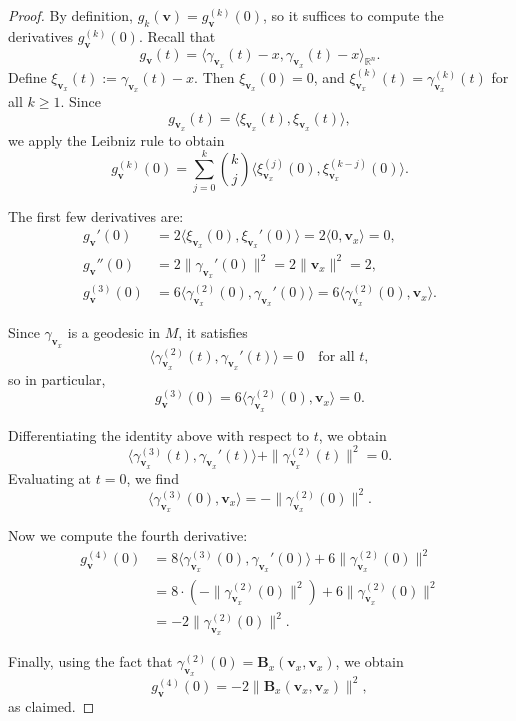 \documentclass{amsart}
\theoremstyle{Theorem}
\theoremstyle{remark}
\numberwithin{equation}{section} \numberwithin{figure}{section}
\newcommand{\mf}[1]{\mathbf{#1}}
\begin{document}
\begin{proof}
By definition, \( g_k(\mathbf{v}) = g_{\mathbf{v}}^{(k)}(0) \), so it suffices to compute the derivatives \( g_{\mathbf{v}}^{(k)}(0) \). Recall that
\[
g_{\mathbf{v}}(t) = \langle \gamma_{\mathbf{v}_{x}}(t) - x, \gamma_{\mathbf{v}_{x}}(t) - x \rangle_{\mathbb{R}^n}.
\]
Define \( \xi_{\mathbf{v}_{x}}(t) := \gamma_{\mathbf{v}_{x}}(t) - x \). Then \( \xi_{\mathbf{v}_{x}}(0) = 0 \), and \( \xi_{\mathbf{v}_{x}}^{(k)}(t) = \gamma_{\mathbf{v}_{x}}^{(k)}(t) \) for all \( k \geq 1 \). Since
\[
g_{\mathbf{v}_{x}}(t) = \langle \xi_{\mathbf{v}_{x}}(t), \xi_{\mathbf{v}_{x}}(t) \rangle,
\]
we apply the Leibniz rule to obtain
\[
g_{\mathbf{v}}^{(k)}(0) = \sum_{j=0}^{k} \binom{k}{j} \langle \xi_{\mathbf{v}_{x}}^{(j)}(0), \xi_{\mathbf{v}_{x}}^{(k-j)}(0) \rangle.
\]

The first few derivatives are:
\begin{align*}
g_{\mathbf{v}}'(0) &= 2 \langle \xi_{\mathbf{v}_{x}}(0), \xi_{\mathbf{v}_{x}}'(0) \rangle = 2 \langle 0, \mathbf{v}_{x} \rangle = 0, \\
g_{\mathbf{v}}''(0) &= 2 \| \gamma_{\mathbf{v}_{x}}'(0) \|^2 = 2 \| \mathbf{v}_{x} \|^2 = 2, \\
g_{\mathbf{v}}^{(3)}(0) &= 6 \langle \gamma_{\mathbf{v}_{x}}^{(2)}(0), \gamma_{\mathbf{v}_{x}}'(0) \rangle = 6 \langle \gamma_{\mathbf{v}_{x}}^{(2)}(0), \mathbf{v}_{x} \rangle.
\end{align*}

Since \( \gamma_{\mathbf{v}_{x}} \) is a geodesic in \( M \), it satisfies
\[
\langle \gamma_{\mathbf{v}_{x}}^{(2)}(t), \gamma_{\mathbf{v}_{x}}'(t) \rangle = 0 \quad \text{for all } t,
\]
so in particular,
\[
g_{\mathbf{v}}^{(3)}(0) = 6 \langle \gamma_{\mathbf{v}_{x}}^{(2)}(0), \mathbf{v}_{x} \rangle = 0.
\]

Differentiating the identity above with respect to \( t \), we obtain
\[
\langle \gamma_{\mathbf{v}_{x}}^{(3)}(t), \gamma_{\mathbf{v}_{x}}'(t) \rangle + \| \gamma_{\mathbf{v}_{x}}^{(2)}(t) \|^2 = 0.
\]
Evaluating at \( t = 0 \), we find
\[
\langle \gamma_{\mathbf{v}_{x}}^{(3)}(0), \mathbf{v}_{x} \rangle = - \| \gamma_{\mathbf{v}_{x}}^{(2)}(0) \|^2.
\]

Now we compute the fourth derivative:
\begin{align*}
g_{\mathbf{v}}^{(4)}(0)
&= 8 \langle \gamma_{\mathbf{v}_{x}}^{(3)}(0), \gamma_{\mathbf{v}_{x}}'(0) \rangle + 6 \| \gamma_{\mathbf{v}_{x}}^{(2)}(0) \|^2 \\
&= 8 \cdot \left( - \| \gamma_{\mathbf{v}_{x}}^{(2)}(0) \|^2 \right) + 6 \| \gamma_{\mathbf{v}_{x}}^{(2)}(0) \|^2 \\
&= -2 \| \gamma_{\mathbf{v}_{x}}^{(2)}(0) \|^2.
\end{align*}

Finally, using the fact that \( \gamma_{\mathbf{v}_{x}}^{(2)}(0) =\mf B_x(\mathbf{v}_{x}, \mathbf{v}_{x}) \), we obtain
\[
g_{\mathbf{v}}^{(4)}(0) = -2 \|\mf B_x(\mathbf{v}_{x}, \mathbf{v}_{x}) \|^2,
\]
as claimed.
\end{proof}
\end{document}
